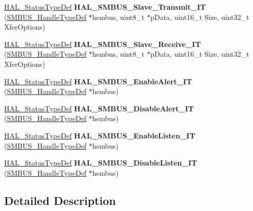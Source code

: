 \begin{DoxyCompactItemize}
\hyperlink{stm32f0xx__hal__def_8h_a63c0679d1cb8b8c684fbb0632743478f}{H\+A\+L\+\_\+\+Status\+Type\+Def} {\bfseries H\+A\+L\+\_\+\+S\+M\+B\+U\+S\+\_\+\+Slave\+\_\+\+Transmit\+\_\+\+IT} (\hyperlink{struct_s_m_b_u_s___handle_type_def}{S\+M\+B\+U\+S\+\_\+\+Handle\+Type\+Def} $\ast$hsmbus, uint8\+\_\+t $\ast$p\+Data, uint16\+\_\+t Size, uint32\+\_\+t Xfer\+Options)
\item 
\mbox{\label{group___non-_blocking__mode___interrupt_ga989041d1840009faf569878c082b5a86}} 
\hyperlink{stm32f0xx__hal__def_8h_a63c0679d1cb8b8c684fbb0632743478f}{H\+A\+L\+\_\+\+Status\+Type\+Def} {\bfseries H\+A\+L\+\_\+\+S\+M\+B\+U\+S\+\_\+\+Slave\+\_\+\+Receive\+\_\+\+IT} (\hyperlink{struct_s_m_b_u_s___handle_type_def}{S\+M\+B\+U\+S\+\_\+\+Handle\+Type\+Def} $\ast$hsmbus, uint8\+\_\+t $\ast$p\+Data, uint16\+\_\+t Size, uint32\+\_\+t Xfer\+Options)
\item 
\mbox{\label{group___non-_blocking__mode___interrupt_ga4e4e15f73f1a4b95e51ffe205cd832d8}} 
\hyperlink{stm32f0xx__hal__def_8h_a63c0679d1cb8b8c684fbb0632743478f}{H\+A\+L\+\_\+\+Status\+Type\+Def} {\bfseries H\+A\+L\+\_\+\+S\+M\+B\+U\+S\+\_\+\+Enable\+Alert\+\_\+\+IT} (\hyperlink{struct_s_m_b_u_s___handle_type_def}{S\+M\+B\+U\+S\+\_\+\+Handle\+Type\+Def} $\ast$hsmbus)
\item 
\mbox{\label{group___non-_blocking__mode___interrupt_ga41168a506bce0b3d905c2c3c3d27db55}} 
\hyperlink{stm32f0xx__hal__def_8h_a63c0679d1cb8b8c684fbb0632743478f}{H\+A\+L\+\_\+\+Status\+Type\+Def} {\bfseries H\+A\+L\+\_\+\+S\+M\+B\+U\+S\+\_\+\+Disable\+Alert\+\_\+\+IT} (\hyperlink{struct_s_m_b_u_s___handle_type_def}{S\+M\+B\+U\+S\+\_\+\+Handle\+Type\+Def} $\ast$hsmbus)
\item 
\mbox{\label{group___non-_blocking__mode___interrupt_ga5be3f13c71b8bfcd3443b50d013c0766}} 
\hyperlink{stm32f0xx__hal__def_8h_a63c0679d1cb8b8c684fbb0632743478f}{H\+A\+L\+\_\+\+Status\+Type\+Def} {\bfseries H\+A\+L\+\_\+\+S\+M\+B\+U\+S\+\_\+\+Enable\+Listen\+\_\+\+IT} (\hyperlink{struct_s_m_b_u_s___handle_type_def}{S\+M\+B\+U\+S\+\_\+\+Handle\+Type\+Def} $\ast$hsmbus)
\item 
\mbox{\label{group___non-_blocking__mode___interrupt_ga1551c1e20a89997d55b9cb17ba256ea5}} 
\hyperlink{stm32f0xx__hal__def_8h_a63c0679d1cb8b8c684fbb0632743478f}{H\+A\+L\+\_\+\+Status\+Type\+Def} {\bfseries H\+A\+L\+\_\+\+S\+M\+B\+U\+S\+\_\+\+Disable\+Listen\+\_\+\+IT} (\hyperlink{struct_s_m_b_u_s___handle_type_def}{S\+M\+B\+U\+S\+\_\+\+Handle\+Type\+Def} $\ast$hsmbus)
\end{DoxyCompactItemize}


\subsection{Detailed Description}
